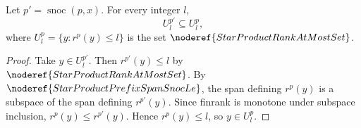 \begin{lemma}
Let \(p'=\operatorname{snoc}(p,x)\).  For every integer \(l\),
\[
  U_l^{p'}\subseteq U_l^p,
\]
where \(U_l^p=\{y:r^p(y)\le l\}\) is the set
\(\noderef{StarProductRankAtMostSet}\).
\end{lemma}
\begin{proof}
Take \(y\in U_l^{p'}\).  Then \(r^{p'}(y)\le l\) by
\(\noderef{StarProductRankAtMostSet}\).  By
\(\noderef{StarProductPrefixSpanSnocLe}\), the span defining \(r^p(y)\) is a
subspace of the span defining \(r^{p'}(y)\).  Since finrank is monotone under
subspace inclusion, \(r^p(y)\le r^{p'}(y)\).
Hence \(r^p(y)\le l\), so \(y\in U_l^p\).
\end{proof}

